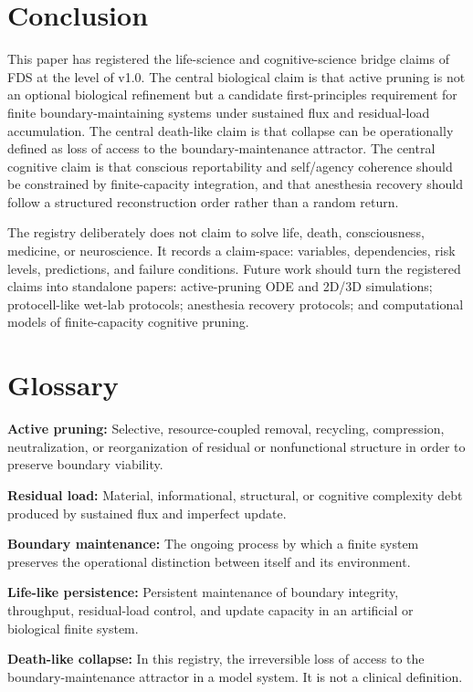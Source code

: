 \documentclass[10pt,a4paper,twocolumn,aps,prl]{revtex4-2}
\theoremstyle{claimstyle}
\theoremstyle{definition}
\newcommand{\FDS}{FDS}
\begin{document}
\section{Conclusion}

This paper has registered the life-science and cognitive-science bridge claims of \FDS{} at the level of v1.0. The central biological claim is that active pruning is not an optional biological refinement but a candidate first-principles requirement for finite boundary-maintaining systems under sustained flux and residual-load accumulation. The central death-like claim is that collapse can be operationally defined as loss of access to the boundary-maintenance attractor. The central cognitive claim is that conscious reportability and self/agency coherence should be constrained by finite-capacity integration, and that anesthesia recovery should follow a structured reconstruction order rather than a random return.

The registry deliberately does not claim to solve life, death, consciousness, medicine, or neuroscience. It records a claim-space: variables, dependencies, risk levels, predictions, and failure conditions. Future work should turn the registered claims into standalone papers: active-pruning ODE and 2D/3D simulations; protocell-like wet-lab protocols; anesthesia recovery protocols; and computational models of finite-capacity cognitive pruning.

\appendix

\section{Glossary}

\textbf{Active pruning:} Selective, resource-coupled removal, recycling, compression, neutralization, or reorganization of residual or nonfunctional structure in order to preserve boundary viability.

\textbf{Residual load:} Material, informational, structural, or cognitive complexity debt produced by sustained flux and imperfect update.

\textbf{Boundary maintenance:} The ongoing process by which a finite system preserves the operational distinction between itself and its environment.

\textbf{Life-like persistence:} Persistent maintenance of boundary integrity, throughput, residual-load control, and update capacity in an artificial or biological finite system.

\textbf{Death-like collapse:} In this registry, the irreversible loss of access to the boundary-maintenance attractor in a model system. It is not a clinical definition.
\end{document}
